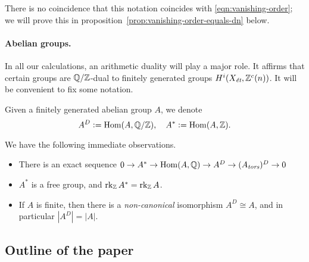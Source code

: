 \documentclass{article}
\numberwithin{equation}{section}
\begin{document}
There is no coincidence that this notation coincides with
\eqref{eqn:vanishing-order}; we will prove this
in proposition~\ref{prop:vanishing-order-equals-dn} below.

\paragraph{Abelian groups.}
In all our calculations, an arithmetic duality
\cite[Theorem~I]{Beshenov-Weil-etale-1} will play a major role. It affirms that
certain groups are $\QQ/\ZZ$-dual to finitely generated groups
$H^i (X_\et, \ZZ^c(n))$. It will be convenient to fix some notation.

\begin{definition}
  \label{dfn:A-D-and-A-star}
  Given a finitely generated abelian group $A$, we denote
  \[ A^D \dfn \Hom (A, \QQ/\ZZ), \quad
    A^* \dfn \Hom (A, \ZZ). \]
\end{definition}

\begin{remark}
  \label{rmk:A-D-and-A-star}
  We have the following immediate observations.
  \begin{itemize}
  \item There is an exact sequence
    $0 \to A^* \to \Hom (A,\QQ) \to A^D \to (A_\tors)^D \to 0$

  \item $A^*$ is a free group, and $\rk_\ZZ A^* = \rk_\ZZ A$.

  \item If $A$ is finite, then there is a \emph{non-canonical} isomorphism
    $A^D \cong A$, and in particular $|A^D| = |A|$.
  \end{itemize}
\end{remark}



\subsection*{Outline of the paper}
\end{document}
